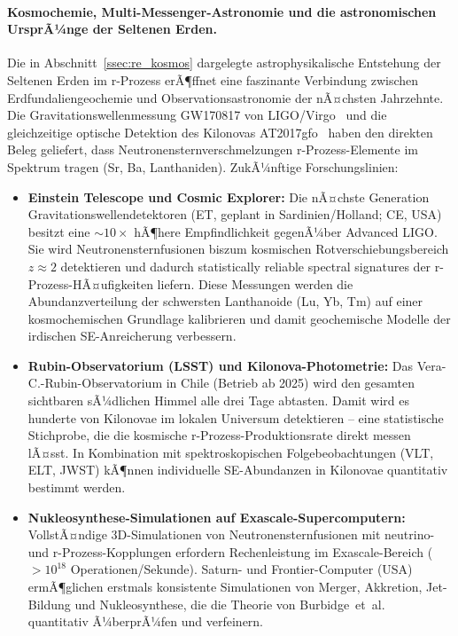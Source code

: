 ﻿\documentclass[12pt, a4paper]{report}
\theoremstyle{definition}
\theoremstyle{remark}
\begin{document}
\paragraph{Kosmochemie, Multi-Messenger-Astronomie und die astronomischen
UrsprÃ¼nge der Seltenen Erden.}
Die in Abschnitt~\ref{ssec:re_kosmos} dargelegte astrophysikalische Entstehung
der Seltenen Erden im r-Prozess erÃ¶ffnet eine faszinante Verbindung zwischen
Erdfundaliengeochemie und Observationsastronomie der nÃ¤chsten Jahrzehnte.
Die Gravitationswellenmessung GW170817 von LIGO/Virgo~\cite{abbott2016} und
die gleichzeitige optische Detektion des Kilonovas AT2017gfo~\cite{smartt2017}
haben den direkten Beleg geliefert, dass Neutronensternverschmelzungen
r-Prozess-Elemente im Spektrum tragen (Sr, Ba, Lanthaniden). ZukÃ¼nftige
Forschungslinien:

\begin{itemize}
  \item \textbf{Einstein Telescope und Cosmic Explorer:}
    Die nÃ¤chste Generation Gravitations\-wellendetek\-toren (ET, geplant in
    Sardinien/Holland; CE, USA) besitzt eine $\sim 10\times$ hÃ¶here
    Empfindlichkeit gegenÃ¼ber Advanced LIGO. Sie wird Neutronensternfusionen
    biszum kosmischen Rotverschiebungsbereich $z \approx 2$ detektieren und
    dadurch statistically reliable spectral signatures der r-Prozess-HÃ¤ufigkeiten
    liefern. Diese Messungen werden die Abundanzverteilung der schwersten
    Lanthanoide (Lu, Yb, Tm) auf einer kosmochemischen Grundlage kalibrieren
    und damit geochemische Modelle der irdischen SE-Anreicherung verbessern.

  \item \textbf{Rubin-Observatorium (LSST) und Kilonova-Photometrie:}
    Das Vera-C.-Rubin-Observatorium in Chile (Betrieb ab 2025) wird den
    gesamten sichtbaren sÃ¼dlichen Himmel alle drei Tage abtasten. Damit
    wird es hunderte von Kilonovae im lokalen Universum detektieren -- eine
    statistische Stichprobe, die die kosmische r-Prozess-Produktionsrate
    direkt messen lÃ¤sst. In Kombination mit spektroskopischen Folgebeobachtungen
    (VLT, ELT, JWST) kÃ¶nnen individuelle SE-Abundanzen in Kilo\-novae
    quantitativ bestimmt werden.

  \item \textbf{Nukleosynthese-Simulationen auf Exascale-Supercomputern:}
    VollstÃ¤ndige 3D-Simulationen von Neutronensternfusionen mit neutrino-
    und r-Prozess-Kopplungen erfordern Rechenleistung im Exascale-Bereich
    ($>10^{18}$ Operationen/Sekunde). Saturn- und Frontier-Computer
    (USA) ermÃ¶glichen erstmals konsistente Simulationen von Merger, Akkretion,
    Jet-Bildung und Nukleosynthese, die die Theorie von
    Burbidge~et~al.~\cite{burbidge1957} quantitativ Ã¼berprÃ¼fen und verfeinern.


\end{itemize}
\end{document}
